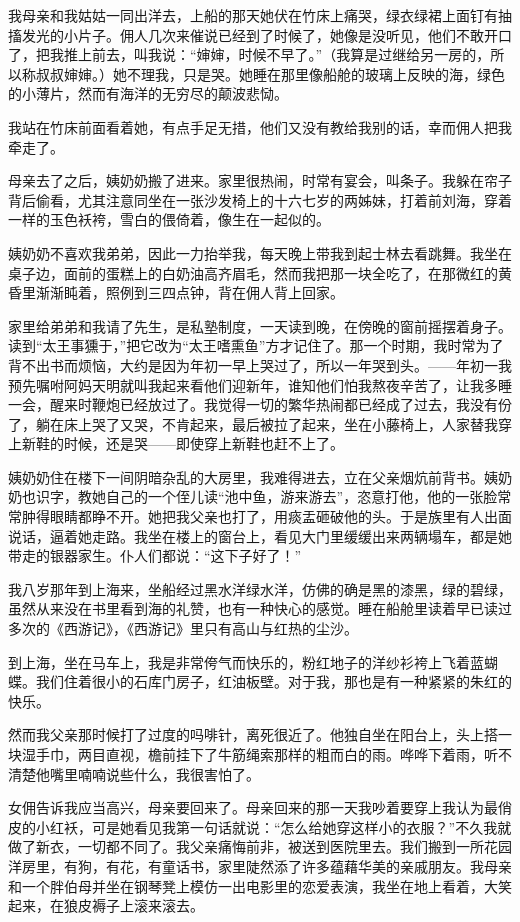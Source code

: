 \par 我母亲和我姑姑一同出洋去，上船的那天她伏在竹床上痛哭，绿衣绿裙上面钉有抽搐发光的小片子。佣人几次来催说已经到了时候了，她像是没听见，他们不敢开口了，把我推上前去，叫我说：“婶婶，时候不早了。”（我算是过继给另一房的，所以称叔叔婶婶。）她不理我，只是哭。她睡在那里像船舱的玻璃上反映的海，绿色的小薄片，然而有海洋的无穷尽的颠波悲恸。
\par 我站在竹床前面看着她，有点手足无措，他们又没有教给我别的话，幸而佣人把我牵走了。
\par 母亲去了之后，姨奶奶搬了进来。家里很热闹，时常有宴会，叫条子。我躲在帘子背后偷看，尤其注意同坐在一张沙发椅上的十六七岁的两姊妹，打着前刘海，穿着一样的玉色袄袴，雪白的偎倚着，像生在一起似的。
\par 姨奶奶不喜欢我弟弟，因此一力抬举我，每天晚上带我到起士林去看跳舞。我坐在桌子边，面前的蛋糕上的白奶油高齐眉毛，然而我把那一块全吃了，在那微红的黄昏里渐渐盹着，照例到三四点钟，背在佣人背上回家。
\par 家里给弟弟和我请了先生，是私塾制度，一天读到晚，在傍晚的窗前摇摆着身子。读到“太王事獯于，”把它改为“太王嗜熏鱼”方才记住了。那一个时期，我时常为了背不出书而烦恼，大约是因为年初一早上哭过了，所以一年哭到头。——年初一我预先嘱咐阿妈天明就叫我起来看他们迎新年，谁知他们怕我熬夜辛苦了，让我多睡一会，醒来时鞭炮已经放过了。我觉得一切的繁华热闹都已经成了过去，我没有份了，躺在床上哭了又哭，不肯起来，最后被拉了起来，坐在小藤椅上，人家替我穿上新鞋的时候，还是哭——即使穿上新鞋也赶不上了。
\par 姨奶奶住在楼下一间阴暗杂乱的大房里，我难得进去，立在父亲烟炕前背书。姨奶奶也识字，教她自己的一个侄儿读“池中鱼，游来游去”，恣意打他，他的一张脸常常肿得眼睛都睁不开。她把我父亲也打了，用痰盂砸破他的头。于是族里有人出面说话，逼着她走路。我坐在楼上的窗台上，看见大门里缓缓出来两辆塌车，都是她带走的银器家生。仆人们都说：“这下子好了！”
\par 我八岁那年到上海来，坐船经过黑水洋绿水洋，仿佛的确是黑的漆黑，绿的碧绿，虽然从来没在书里看到海的礼赞，也有一种快心的感觉。睡在船舱里读着早已读过多次的《西游记》，《西游记》里只有高山与红热的尘沙。
\par 到上海，坐在马车上，我是非常侉气而快乐的，粉红地子的洋纱衫袴上飞着蓝蝴蝶。我们住着很小的石库门房子，红油板壁。对于我，那也是有一种紧紧的朱红的快乐。
\par 然而我父亲那时候打了过度的吗啡针，离死很近了。他独自坐在阳台上，头上搭一块湿手巾，两目直视，檐前挂下了牛筋绳索那样的粗而白的雨。哗哗下着雨，听不清楚他嘴里喃喃说些什么，我很害怕了。
\par 女佣告诉我应当高兴，母亲要回来了。母亲回来的那一天我吵着要穿上我认为最俏皮的小红袄，可是她看见我第一句话就说：“怎么给她穿这样小的衣服？”不久我就做了新衣，一切都不同了。我父亲痛悔前非，被送到医院里去。我们搬到一所花园洋房里，有狗，有花，有童话书，家里陡然添了许多蕴藉华美的亲戚朋友。我母亲和一个胖伯母并坐在钢琴凳上模仿一出电影里的恋爱表演，我坐在地上看着，大笑起来，在狼皮褥子上滚来滚去。
